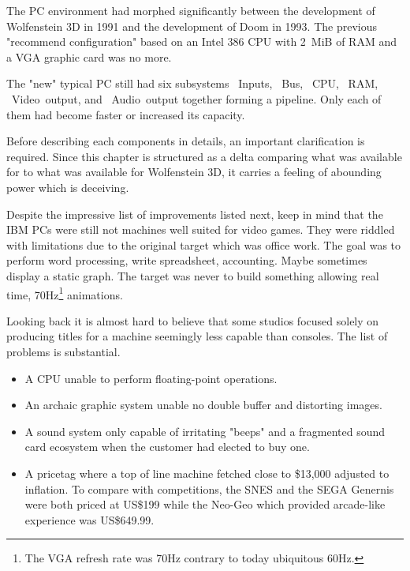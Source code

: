The PC environment had morphed significantly between the development of Wolfenstein 3D in 1991 and the development of Doom in 1993. The previous "recommend configuration" based on an Intel 386 CPU with 2~MiB of RAM and a VGA graphic card was no more.\\
\par
The "new" typical PC still had six subsystems ~Inputs, ~Bus, ~CPU, ~RAM, ~Video~output, and ~Audio~output together forming a pipeline. Only each of them had become faster or increased its capacity.\\
\par
\vspace{2mm}
\par
 Before describing each components in details, an important clarification is required. Since this chapter is structured as a delta comparing what was available for \doom to what was available for Wolfenstein 3D, it carries a feeling of abounding power which is deceiving. \\
 \par
 Despite the impressive list of improvements listed next, keep in mind that the IBM PCs were still not machines well suited for video games. They were riddled with limitations due to the original target which was office work. The goal was to perform word processing, write spreadsheet, accounting. Maybe sometimes display a static graph. The target was never to build something allowing real time, 70Hz\footnote{The VGA refresh rate was 70Hz contrary to today ubiquitous 60Hz.} animations.\\ 
\par 
Looking back it is almost hard to believe that some studios focused solely on producing titles for a machine seemingly less capable than consoles. The list of problems is substantial.
\begin{itemize}
\item A CPU unable to perform floating-point operations.
\item An archaic graphic system unable no double buffer and distorting images.
\item A sound system only capable of irritating "beeps" and a fragmented sound card ecosystem when the customer had elected to buy one.
\item A pricetag where a top of line machine fetched close to \$13,000 adjusted to inflation. To compare with competitions, the SNES and the SEGA Genernis were both priced at US\$199 while the Neo-Geo which provided arcade-like experience was US\$649.99.
\end{itemize}
